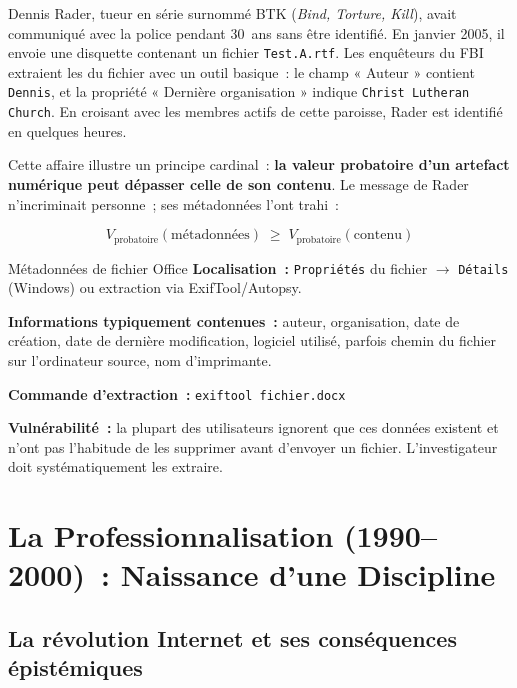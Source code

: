 Dennis Rader, tueur en série surnommé BTK (\textit{Bind, Torture, Kill}),
avait communiqué avec la police pendant 30~ans sans être identifié. En
janvier 2005, il envoie une disquette contenant un fichier
\texttt{Test.A.rtf}. Les enquêteurs du FBI extraient les
 du fichier avec un outil basique~:
le champ « Auteur » contient \texttt{Dennis}, et la propriété « Dernière
organisation » indique \texttt{Christ Lutheran Church}. En croisant avec
les membres actifs de cette paroisse, Rader est identifié en quelques
heures.

\medskip

Cette affaire illustre un principe cardinal~: \textbf{la valeur probatoire
d'un artefact numérique peut dépasser celle de son contenu}. Le message
de Rader n'incriminait personne~; ses métadonnées l'ont trahi~:

\begin{equation}
V_{\text{probatoire}}(\text{métadonnées}) \;\geq\;
V_{\text{probatoire}}(\text{contenu})
\label{eq:meta-superieur}
\end{equation}

\begin{boxartefact}{Métadonnées de fichier Office}
\textbf{Localisation~:} \texttt{Propriétés} du fichier $\to$
\texttt{Détails} (Windows) ou extraction via ExifTool/Autopsy.

\textbf{Informations typiquement contenues~:} auteur, organisation, date de
création, date de dernière modification, logiciel utilisé, parfois chemin
du fichier sur l'ordinateur source, nom d'imprimante.

\textbf{Commande d'extraction~:}
\lstinline[language=bash_forensique]{exiftool fichier.docx}

\textbf{Vulnérabilité~:} la plupart des utilisateurs ignorent que ces
données existent et n'ont pas l'habitude de les supprimer avant d'envoyer
un fichier. L'investigateur doit systématiquement les extraire.
\end{boxartefact}

\section{La Professionnalisation (1990--2000)~: Naissance d'une Discipline}

\subsection{La révolution Internet et ses conséquences épistémiques}

